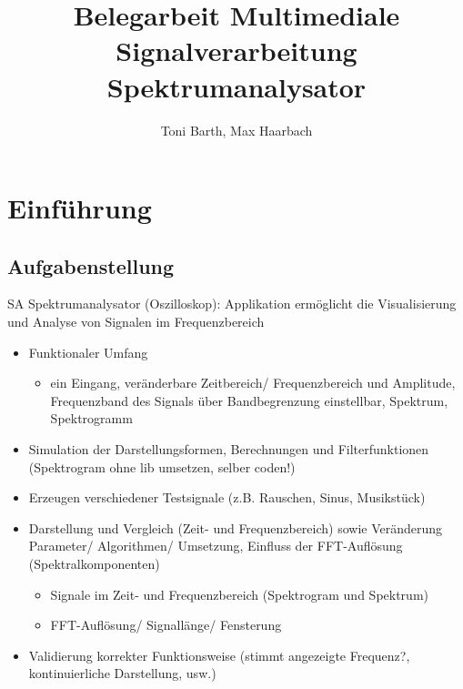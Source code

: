 \documentclass[a4paper]{article}
\title{Belegarbeit Multimediale Signalverarbeitung\\Spektrumanalysator}
\author{Toni Barth, Max Haarbach}
\begin{document}
\begin{titlepage}
\clearpage\maketitle
\thispagestyle{empty}
\end{titlepage}


\newpage
\tableofcontents
\newpage
\listoffigures
\newpage
\section{Einführung}\label{sec:einführung}

\subsection{Aufgabenstellung}\label{subsec:aufgabenstellung}

SA Spektrumanalysator (Oszilloskop): Applikation ermöglicht die Visualisierung und Analyse von Signalen im Frequenzbereich
\begin{itemize}
  \item Funktionaler Umfang
  \begin{itemize}
    \item ein Eingang, veränderbare Zeitbereich/ Frequenzbereich und Amplitude, Frequenzband des Signals über Bandbegrenzung einstellbar, Spektrum, Spektrogramm
  \end{itemize}
  \item Simulation der Darstellungsformen, Berechnungen und Filterfunktionen (Spektrogram ohne lib umsetzen, selber coden!)
  \item Erzeugen verschiedener Testsignale (z.B. Rauschen, Sinus, Musikstück)
  \item Darstellung und Vergleich (Zeit- und Frequenzbereich) sowie Veränderung Parameter/ Algorithmen/ Umsetzung, Einfluss der FFT-Auflösung (Spektralkomponenten)
  \begin{itemize}
    \item Signale im Zeit- und Frequenzbereich (Spektrogram und Spektrum)
    \item FFT-Auflösung/ Signallänge/ Fensterung
  \end{itemize}
  \item Validierung korrekter Funktionsweise (stimmt angezeigte Frequenz?, kontinuierliche Darstellung, usw.)
\end{itemize}
\end{document}
